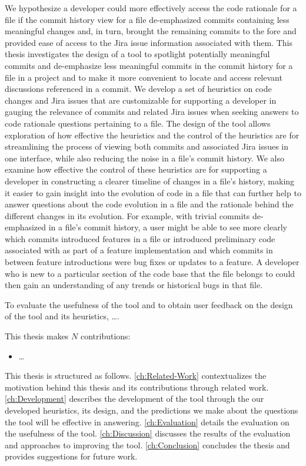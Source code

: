 We hypothesize a developer could more effectively access the code rationale for a file if the commit history view for a file de-emphasized commits containing less meaningful changes and, in turn, brought the remaining commits to the fore and provided ease of access to the Jira issue information associated with them.
This thesis investigates the design of a tool to spotlight potentially meaningful commits and de-emphasize less meaningful commits in the commit history for a file in a project and to make it more convenient to locate and access relevant discussions referenced in a commit. 
We develop a set of heuristics on code changes and Jira issues that are customizable for supporting a developer in gauging the relevance of commits and related Jira issues when seeking answers to code rationale questions pertaining to a file.
The design of the tool allows exploration of how effective the heuristics and the control of the heuristics are for streamlining the process of viewing both commits and associated Jira issues in one interface, while also reducing the noise in a file's commit history.
We also examine how effective the control of these heuristics are for supporting a developer in constructing a clearer timeline of changes in a file's history, making it easier to gain insight into the evolution of code in a file that can further help to answer questions about the code evolution in a file and the rationale behind the different changes in its evolution. 
For example, with trivial commits de-emphasized in a file's commit history, a user might be able to see more clearly which commits introduced features in a file or introduced preliminary code associated with as part of a feature implementation and which commits in between feature introductions were bug fixes or updates to a feature.
A developer who is new to a particular section of the code base that the file belongs to could then gain an understanding of any trends or historical bugs in that file.

To evaluate the usefulness of the tool and to obtain user feedback on the design of the tool and its heuristics, \dots {}.

This thesis makes $N$ contributions:
\begin{itemize}
	\item \dots {}
\end{itemize}

This thesis is structured as follows. 
\autoref{ch:Related-Work} contextualizes the motivation behind this thesis and its contributions through related work. 
\autoref{ch:Development} describes the development of the tool through the our developed heuristics, its design, and the predictions we make about the questions the tool will be effective in answering. 
\autoref{ch:Evaluation} details the evaluation on the usefulness of the tool.
\autoref{ch:Discussion} discusses the results of the evaluation and approaches to improving the tool.
\autoref{ch:Conclusion} concludes the thesis and provides suggestions for future work.

\endinput

Any text after an \endinput is ignored.
You could put scraps here or things in progress.
